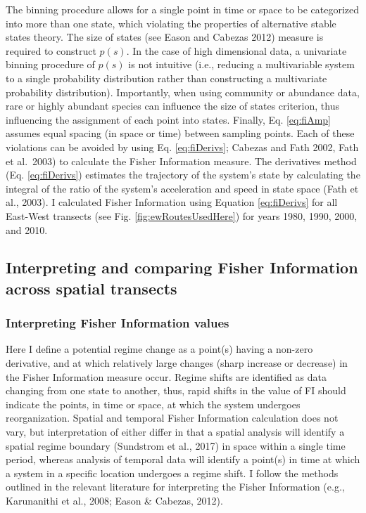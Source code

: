 \documentclass[12pt,twoside,openany]{reedthesis}
\begin{document}
The binning procedure allows for a single point in time or space to be categorized into more than one state, which violating the properties of alternative stable states theory. The size of states (see Eason and Cabezas 2012) measure is required to construct \(p(s)\). In the case of high dimensional data, a univariate binning procedure of \(p(s)\) is not intuitive (i.e., reducing a multivariable system to a single probability distribution rather than constructing a multivariate probability distribution). Importantly, when using community or abundance data, rare or highly abundant species can influence the size of states criterion, thus influencing the assignment of each point into states. Finally, Eq. \eqref{eq:fiAmp} assumes equal spacing (in space or time) between sampling points. Each of these violations can be avoided by using Eq. \eqref{eq:fiDerivs}; Cabezas and Fath 2002, Fath et al.~2003) to calculate the Fisher Information measure. The derivatives method (Eq. \eqref{eq:fiDerivs}) estimates the trajectory of the system's state by calculating the integral of the ratio of the system's acceleration and speed in state space (Fath et al., 2003). I calculated Fisher Information using Equation \eqref{eq:fiDerivs} for all East-West transects (see Fig. \ref{fig:ewRoutesUsedHere}) for years 1980, 1990, 2000, and 2010.

\hypertarget{interpreting-and-comparing-fisher-information-across-spatial-transects}{%
\subsection{Interpreting and comparing Fisher Information across spatial transects}\label{interpreting-and-comparing-fisher-information-across-spatial-transects}}

\hypertarget{interpreting-fisher-information-values}{%
\subsubsection{Interpreting Fisher Information values}\label{interpreting-fisher-information-values}}

Here I define a potential regime change as a point(s) having a non-zero derivative, and at which relatively large changes (sharp increase or decrease) in the Fisher Information measure occur. Regime shifts are identified as data changing from one state to another, thus, rapid shifts in the value of FI should indicate the points, in time or space, at which the system undergoes reorganization. Spatial and temporal Fisher Information calculation does not vary, but interpretation of either differ in that a spatial analysis will identify a spatial regime boundary (Sundstrom et al., 2017) in space within a single time period, whereas analysis of temporal data will identify a point(s) in time at which a system in a specific location undergoes a regime shift. I follow the methods outlined in the relevant literature for interpreting the Fisher Information (e.g., Karunanithi et al., 2008; Eason \& Cabezas, 2012).
\end{document}
